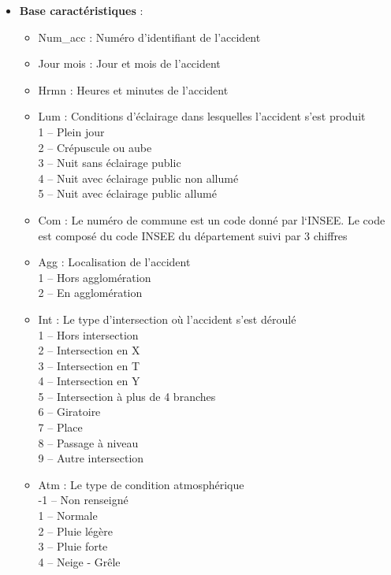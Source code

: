 \documentclass[french,]{tp}
\providecommand{\tightlist}{%
  \setlength{\itemsep}{0pt}\setlength{\parskip}{0pt}}
\begin{document}
\begin{itemize}
\tightlist
\item
  \textbf{Base caractéristiques} :

  \begin{itemize}
  \item
    Num\_acc : Numéro d'identifiant de l'accident
  \item
    Jour mois : Jour et mois de l'accident
  \item
    Hrmn : Heures et minutes de l'accident
  \item
    Lum : Conditions d'éclairage dans lesquelles l'accident s'est produit\\
    1 -- Plein jour\\
    2 -- Crépuscule ou aube\\
    3 -- Nuit sans éclairage public\\
    4 -- Nuit avec éclairage public non allumé\\
    5 -- Nuit avec éclairage public allumé
  \item
    Com : Le numéro de commune est un code donné par l`INSEE. Le code est composé du code INSEE du département suivi par 3 chiffres
  \item
    Agg : Localisation de l'accident\\
    1 -- Hors agglomération\\
    2 -- En agglomération
  \item
    Int : Le type d'intersection où l'accident s'est déroulé\\
    1 -- Hors intersection\\
    2 -- Intersection en X\\
    3 -- Intersection en T\\
    4 -- Intersection en Y\\
    5 -- Intersection à plus de 4 branches\\
    6 -- Giratoire\\
    7 -- Place\\
    8 -- Passage à niveau\\
    9 -- Autre intersection
  \item
    Atm : Le type de condition atmosphérique\\
    -1 -- Non renseigné\\
    1 -- Normale\\
    2 -- Pluie légère\\
    3 -- Pluie forte\\
    4 -- Neige - Grêle\\

\end{itemize}
\end{itemize}
\end{document}
